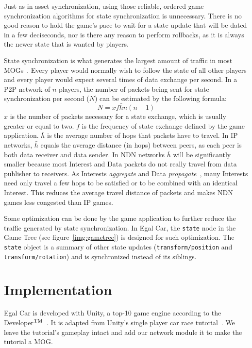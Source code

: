 \documentclass{article}
\def\tm{\leavevmode\hbox{$\rm {}^{TM}$}} %
\begin{document}
Just as in asset synchronization, using those reliable, ordered game synchronization algorithms for state synchronization is unnecessary. There is no good reason to hold the game's pace to wait for a state update that will be dated in a few deciseconds, nor is there any reason to perform rollbacks, as it is always the newer state that is wanted by players.

State synchronization is what generates the largest amount of traffic in most MOGs~\cite{Upen}. Every player would normally wish to follow the state of all other players and every player would expect several times of data exchange per second. In a P2P network of $n$ players, the number of packets being sent for state synchronization per second ($N$) can be estimated by the following formula:
\begin{equation}
N = xf\bar{h}n(n-1)
\end{equation}
$x$ is the number of packets necessary for a state exchange, which is usually greater or equal to two. $f$ is the frequency of state exchange defined by the game application. $\bar{h}$ is the average number of hops that packets have to travel. In IP networks, $\bar{h}$ equals the average distance (in hops) between peers, as each peer is both data receiver and data sender. In NDN networks $\bar{h}$ will be significantly smaller because most Interest and Data packets do not really travel from data publisher to receivers. As Interests \emph{aggregate} and Data \emph{propagate}~\cite{Jndn}, many Interests need only travel a few hops to be satisfied or to be combined with an identical Interest. This reduces the average travel distance of packets and makes NDN games less congested than IP games.

Some optimization can be done by the game application to further reduce the traffic generated by state synchronization. In Egal Car, the \texttt{state} node in the Game Tree (see figure~\ref{img:gametree}) is designed for such optimization. The \texttt{state} object is a summary of other state updates (\texttt{transform/position} and \texttt{transform/rotation}) and is synchronized instead of its siblings.


\section{Implementation}
\label{implementation}

Egal Car is developed with Unity, a top-10 game engine according to the Developer\tm~\cite{unityrank}. It is adapted from Unity's single player car race tutorial~\cite{UnityCar}. We leave the tutorial's gameplay intact and add our network module it to make the tutorial a MOG. 
\end{document}
